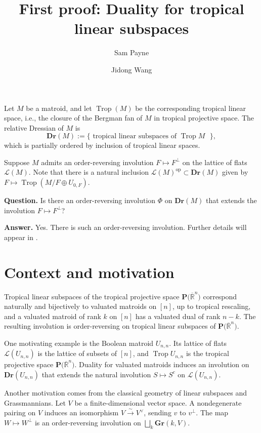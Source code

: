 \documentclass{article}
\author{Sam Payne \and Jidong Wang}
\title{First proof: Duality for tropical linear subspaces}
\date{}
\theoremstyle{definition}
\newcommand{\Rbar}{\overline{\mathbb{R}}}
\newcommand{\Trop}{\operatorname{Trop}}
\newcommand{\op}{\operatorname{op}}
\newcommand{\PT}[1]{\mathbf{P}\big(\mathbb{\Rbar}^{#1}\big)}
\newcommand{\cLL}{\mathcal{L}}
\newcommand{\Gr}{\mathbf{Gr}}
\newcommand{\Dr}{\mathbf{Dr}}
\begin{document}
\maketitle


Let $M$ be a matroid, and let $\Trop(M)$ be the corresponding tropical linear space, i.e., the closure of the Bergman fan of $M$ in tropical projective space. The relative Dressian of $M$ is 
\[ \Dr(M) :=\{\text{ tropical linear subspaces of $\Trop M$ }\}, \]
which is partially ordered by inclusion of tropical linear spaces. 

Suppose $M$ admits an order-reversing involution $F\mapsto F^\perp$ on the lattice of flats $\cLL(M)$. Note that there is a natural inclusion $\cLL(M)^{\op} \subset \Dr(M)$ given by $F\mapsto \Trop(M/F\oplus U_{0,F})$.

\medskip
\noindent \textbf{Question.}  Is there an order-reversing involution $\Phi$ on $\Dr(M)$ that extends the involution $F\mapsto F^\perp$?%

\medskip

\noindent \textbf{Answer.} Yes. There is such an order-reversing involution. Further details will appear in \cite{wang26modular}.


\section{Context and motivation}



Tropical linear subspaces of the tropical projective space $\PT{n}$ correspond naturally and bijectively to valuated matroids on $[n]$, up to tropical rescaling, and a valuated matroid of rank $k$ on $[n]$ has a valuated dual of rank $n-k$. The resulting involution is order-reversing on tropical linear subspaces of $\PT{n}$.

One motivating example is the Boolean matroid $U_{n,n}$. Its lattice of flats $\cLL(U_{n,n})$ is the lattice of subsets of $[n]$, and $\Trop U_{n,n}$ is the tropical projective space $\PT{n}$. Duality for valuated matroids induces an involution on $\Dr(U_{n,n})$ that extends the natural involution $S \mapsto S^c$ on $\cLL(U_{n,n})$.



Another motivation comes from the classical geometry of linear subspaces and Grassmannians. Let $V$ be a finite-dimensional vector space. A nondegenerate pairing on $V$ induces an isomorphism $V\xrightarrow{\sim}V^\vee$, sending $v$ to $v^\perp$. The map $W\mapsto W^\perp$ is an order-reversing involution on $\bigsqcup_k\Gr(k,V)$. 
\end{document}
